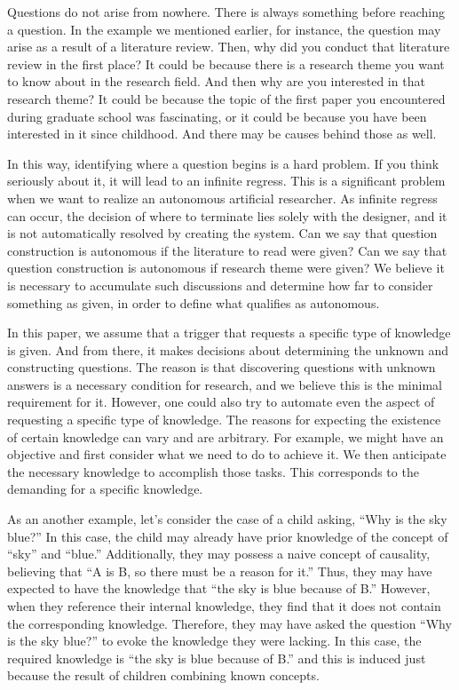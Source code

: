 Questions do not arise from nowhere. There is always something before reaching a question. In the example we mentioned earlier, for instance, the question may arise as a result of a literature review. Then, why did you conduct that literature review in the first place? It could be because there is a research theme you want to know about in the research field. And then why are you interested in that research theme? It could be because the topic of the first paper you encountered during graduate school was fascinating, or it could be because you have been interested in it since childhood. And there may be causes behind those as well.

In this way, identifying where a question begins is a hard problem. If you think seriously about it, it will lead to an infinite regress. This is a significant problem when we want to realize an autonomous artificial researcher. As infinite regress can occur, the decision of where to terminate lies solely with the designer, and it is not automatically resolved by creating the system. Can we say that question construction is autonomous if the literature to read were given? Can we say that question construction is autonomous if research theme were given? We believe it is necessary to accumulate such discussions and determine how far to consider something as given, in order to define what qualifies as autonomous.

In this paper, we assume that a trigger that requests a specific type of knowledge is given. And from there, it makes decisions about determining the unknown and constructing questions. The reason is that discovering questions with unknown answers is a necessary condition for research, and we believe this is the minimal requirement for it. However, one could also try to automate even the aspect of requesting a specific type of knowledge. The reasons for expecting the existence of certain knowledge can vary and are arbitrary. For example, we might have an objective and first consider what we need to do to achieve it. We then anticipate the necessary knowledge to accomplish those tasks. This corresponds to the demanding for a specific knowledge.

As an another example, let's consider the case of a child asking, ``Why is the sky blue?'' In this case, the child may already have prior knowledge of the concept of ``sky'' and ``blue.'' Additionally, they may possess a naive concept of causality, believing that ``A is B, so there must be a reason for it.'' Thus, they may have expected to have the knowledge that ``the sky is blue because of B.'' However, when they reference their internal knowledge, they find that it does not contain the corresponding knowledge. Therefore, they may have asked the question ``Why is the sky blue?'' to evoke the knowledge they were lacking. In this case, the required knowledge is ``the sky is blue because of B.'' and this is induced just because the result of children combining known concepts.

